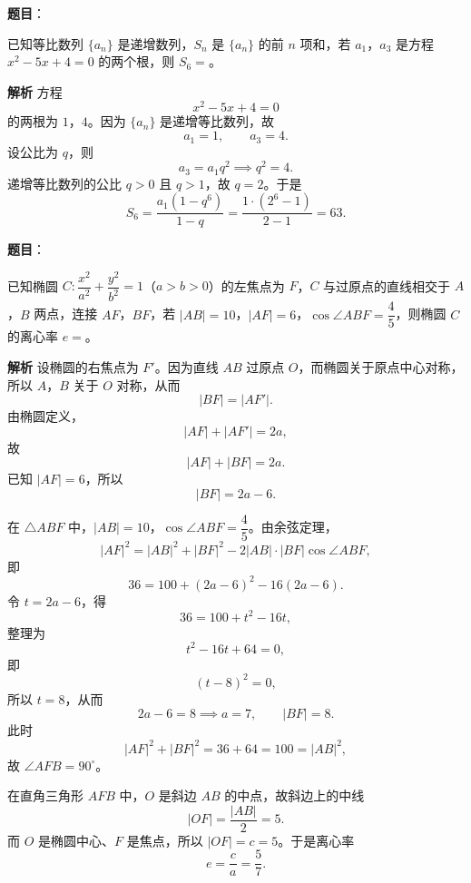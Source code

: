 \begin{answer}

\textbf{题目}：

已知等比数列 $\{a_n\}$ 是递增数列，$S_n$ 是 $\{a_n\}$ 的前 $n$ 项和，若 $a_1$，$a_3$ 是方程 $x^2-5x+4=0$ 的两个根，则 $S_6=$\gkblank{}。

\textbf{解析}
方程
\nopagebreak[4]
\[x^2-5x+4=0\]
的两根为 $1$，$4$。因为 $\{a_n\}$ 是递增等比数列，故
\nopagebreak[4]
\[a_1=1,\qquad a_3=4.\]
设公比为 $q$，则
\nopagebreak[4]
\[a_3=a_1q^2\implies q^2=4.\]
递增等比数列的公比 $q>0$ 且 $q>1$，故 $q=2$。于是
\nopagebreak[4]
\[S_6=\frac{a_1(1-q^6)}{1-q}=\frac{1\cdot(2^6-1)}{2-1}=63.\]


\end{answer}
\begin{answer}

\textbf{题目}：

已知椭圆 $C:\dfrac{x^2}{a^2}+\dfrac{y^2}{b^2}=1$（$a>b>0$）的左焦点为 $F$，$C$ 与过原点的直线相交于 $A$，$B$ 两点，连接 $AF$，$BF$，若 $|AB|=10$，$|AF|=6$，$\cos\angle ABF=\dfrac45$，则椭圆 $C$ 的离心率 $e=$\gkblank{}。

\textbf{解析}
设椭圆的右焦点为 $F'$。因为直线 $AB$ 过原点 $O$，而椭圆关于原点中心对称，所以 $A$，$B$ 关于 $O$ 对称，从而
\nopagebreak[4]
\[|BF|=|AF'|.\]
由椭圆定义，
\nopagebreak[4]
\[|AF|+|AF'|=2a,\]
故
\nopagebreak[4]
\[|AF|+|BF|=2a.\]
已知 $|AF|=6$，所以
\nopagebreak[4]
\[|BF|=2a-6.\]

在 $\triangle ABF$ 中，$|AB|=10$，$\cos\angle ABF=\dfrac45$。由余弦定理，
\nopagebreak[4]
\[|AF|^2=|AB|^2+|BF|^2-2|AB|\cdot|BF|\cos\angle ABF,\]
即
\nopagebreak[4]
\[36=100+(2a-6)^2-16(2a-6).\]
令 $t=2a-6$，得
\nopagebreak[4]
\[36=100+t^2-16t,\]
整理为
\nopagebreak[4]
\[t^2-16t+64=0,\]
即
\nopagebreak[4]
\[(t-8)^2=0,\]
所以 $t=8$，从而
\nopagebreak[4]
\[2a-6=8\implies a=7,\qquad |BF|=8.\]
此时
\nopagebreak[4]
\[|AF|^2+|BF|^2=36+64=100=|AB|^2,\]
故 $\angle AFB=90^\circ$。

在直角三角形 $AFB$ 中，$O$ 是斜边 $AB$ 的中点，故斜边上的中线
\nopagebreak[4]
\[|OF|=\frac{|AB|}2=5.\]
而 $O$ 是椭圆中心、$F$ 是焦点，所以 $|OF|=c=5$。于是离心率
\nopagebreak[4]
\[e=\frac ca=\frac57.\]


\end{answer}
